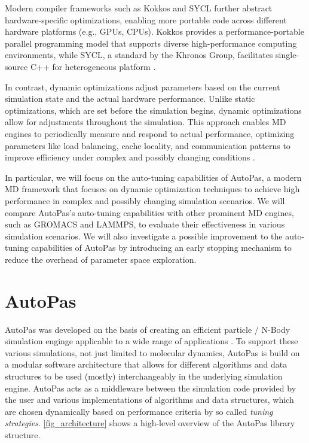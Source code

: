 \documentclass[conference]{IEEEtran}
\begin{document}
Modern compiler frameworks such as Kokkos and SYCL further abstract hardware-specific optimizations, enabling more portable code across different hardware platforms (e.g., GPUs, CPUs). Kokkos provides a performance-portable parallel programming model that supports diverse high-performance computing environments, while SYCL, a standard by the Khronos Group, facilitates single-source C++ for heterogeneous platform .

In contrast, dynamic optimizations adjust parameters based on the current simulation state and the actual hardware performance. Unlike static optimizations, which are set before the simulation begins, dynamic optimizations allow for adjustments throughout the simulation. This approach enables MD engines to periodically measure and respond to actual performance, optimizing parameters like load balancing, cache locality, and communication patterns to improve efficiency under complex and possibly changing conditions .


In particular, we will focus on the auto-tuning capabilities of AutoPas, a modern MD framework that focuses on dynamic optimization techniques to achieve high performance in complex and possibly changing simulation scenarios. We will compare AutoPas's auto-tuning capabilities with other prominent MD engines, such as GROMACS and LAMMPS, to evaluate their effectiveness in various simulation scenarios. We will also investigate a possible improvement to the auto-tuning capabilities of AutoPas by introducing an early stopping mechanism to reduce the overhead of parameter space exploration.


\section{AutoPas}

AutoPas was developed on the basis of creating an efficient particle / N-Body simulation enginge applicable to a wide range of applications \cite{Tchipev2020}. To support these various simulations, not just limited to molecular dynamics, AutoPas is build on a modular software architecture that allows for different algorithms and data structures to be used (mostly) interchangeably in the underlying simulation engine. AutoPas acts as a middleware between the simulation code provided by the user and various implementations of algorithms and data structures, which are chosen dynamically based on performance criteria by so called \textit{tuning strategies}. \autoref{fig_architecture} shows a high-level overview of the AutoPas library structure.
\end{document}
